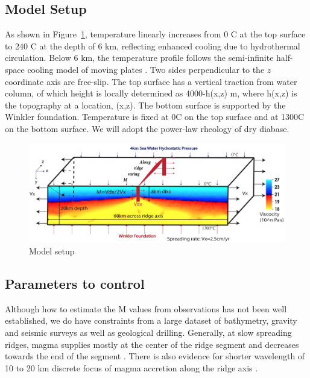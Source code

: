 \subsection{Model Setup}
As shown in Figure~\ref{fig_Methods8_1}, temperature linearly increases from 0 \degree C at the top surface to 240 \degree C at the depth of 6 km, reflecting enhanced cooling due to hydrothermal circulation. Below 6 km, the temperature profile follows the semi-infinite half-space cooling model of moving plates \citep[e.g.,][]{Turcotte2002}. Two sides perpendicular to the $z$ coordinate axis are free-slip. The top surface has a vertical traction from water column, of which height is locally determined as 4000-h(x,z) m, where h(x,z) is the topography at a location, (x,z). The bottom surface is supported by the Winkler foundation. Temperature is fixed at 0\degree C on the top surface and at 1300\degree C on the bottom surface. We will adopt the power-law rheology of dry diabase\citep[e.g.,][]{Kirby1987, Buck2005}. 

\begin{figure}[H]
 \centering
  \includegraphics[width=1.0\textwidth] {fig_Methods8_1.png}
 \caption{\small Model setup}
 \label{fig_Methods8_1}
\end{figure}


\subsection{Parameters to control}
Although how to estimate the M values from observations has not been well established, we do have constraints from a large dataset of bathymetry, gravity and seismic surveys as well as geological drilling. Generally, at slow spreading ridges, magma supplies mostly at the center of the ridge segment and decreases towards the end of the segment \citep{Tolstoy1993,Chen1999}. There is also evidence for shorter wavelength of 10 to 20 km discrete focus of magma accretion along the ridge axis \citep{Lin1990}. 

